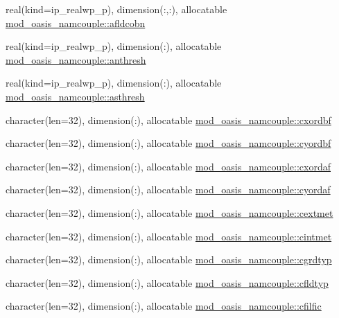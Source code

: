 \begin{DoxyCompactItemize}
\item 
real(kind=ip\+\_\+realwp\+\_\+p), dimension(\+:,\+:), allocatable \hyperlink{namespacemod__oasis__namcouple_a8f9d02a3ec2e9e46742d6c6073b39199}{mod\+\_\+oasis\+\_\+namcouple\+::afldcobn}
\item 
real(kind=ip\+\_\+realwp\+\_\+p), dimension(\+:), allocatable \hyperlink{namespacemod__oasis__namcouple_ae61173ac38ba4ae398fb0d4bef686f7d}{mod\+\_\+oasis\+\_\+namcouple\+::anthresh}
\item 
real(kind=ip\+\_\+realwp\+\_\+p), dimension(\+:), allocatable \hyperlink{namespacemod__oasis__namcouple_a3e5d6e25f3a6b976b50b3c26f610f41a}{mod\+\_\+oasis\+\_\+namcouple\+::asthresh}
\item 
character(len=32), dimension(\+:), allocatable \hyperlink{namespacemod__oasis__namcouple_a047e7be9411842edfe8326ba22d3e92d}{mod\+\_\+oasis\+\_\+namcouple\+::cxordbf}
\item 
character(len=32), dimension(\+:), allocatable \hyperlink{namespacemod__oasis__namcouple_a704f4d4aef4d10f10c668e7eea404480}{mod\+\_\+oasis\+\_\+namcouple\+::cyordbf}
\item 
character(len=32), dimension(\+:), allocatable \hyperlink{namespacemod__oasis__namcouple_a5d93e0a5d832f73e9cc9d811d82342a0}{mod\+\_\+oasis\+\_\+namcouple\+::cxordaf}
\item 
character(len=32), dimension(\+:), allocatable \hyperlink{namespacemod__oasis__namcouple_a6af7c46f2c920cf3a64eaa879e193351}{mod\+\_\+oasis\+\_\+namcouple\+::cyordaf}
\item 
character(len=32), dimension(\+:), allocatable \hyperlink{namespacemod__oasis__namcouple_aca9e7961bb0caa6d66fb6e4ea3b78fa9}{mod\+\_\+oasis\+\_\+namcouple\+::cextmet}
\item 
character(len=32), dimension(\+:), allocatable \hyperlink{namespacemod__oasis__namcouple_a46b91a5afb3ade08bc72832fca0b6459}{mod\+\_\+oasis\+\_\+namcouple\+::cintmet}
\item 
character(len=32), dimension(\+:), allocatable \hyperlink{namespacemod__oasis__namcouple_af696efdbc59af586a6f3ffe4acb19c17}{mod\+\_\+oasis\+\_\+namcouple\+::cgrdtyp}
\item 
character(len=32), dimension(\+:), allocatable \hyperlink{namespacemod__oasis__namcouple_a28927100ad1c6c0a4206fb6026286f2a}{mod\+\_\+oasis\+\_\+namcouple\+::cfldtyp}
\item 
character(len=32), dimension(\+:), allocatable \hyperlink{namespacemod__oasis__namcouple_a10f5e54ac2bf61f604faa422a748724f}{mod\+\_\+oasis\+\_\+namcouple\+::cfilfic}

\end{DoxyCompactItemize}
